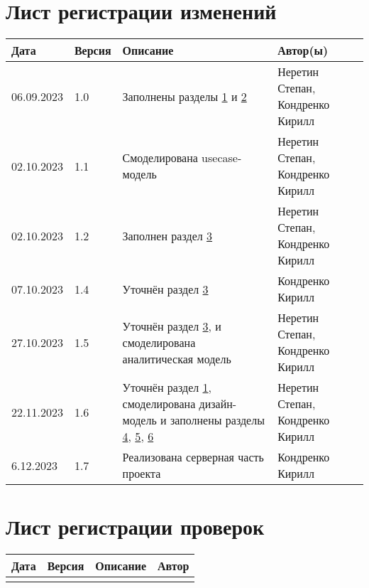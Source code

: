 \chapter*{Лист регистрации изменений}
	\begin{tabularx}{\textwidth}{
			| >{\centering\arraybackslash\hsize=2.5cm}X
			| >{\centering\arraybackslash\hsize=1.5cm}X
			| >{\centering\arraybackslash}X
			| >{\centering\arraybackslash\hsize=5cm}X
			|}
		\hline
		\textbf{Дата} & \textbf{Версия} & \textbf{Описание} & \textbf{Автор(ы)} \\\hline
		
		06.09.2023 & 1.0 & Заполнены разделы \hyperref[chapter1]{1} и \hyperref[chapter2]{2} & Неретин Степан, Кондренко Кирилл \\\hline
				
		02.10.2023 & 1.1 & Смоделирована usecase-модель & Неретин Степан, Кондренко Кирилл \\\hline
		
		02.10.2023 & 1.2 & Заполнен раздел \hyperref[chapter3]{3} & Неретин Степан, Кондренко Кирилл \\\hline
		
		07.10.2023 & 1.4 & Уточнён раздел \hyperref[chapter3]{3} & Кондренко Кирилл \\\hline

		27.10.2023 & 1.5 & Уточнён раздел \hyperref[chapter3]{3}, и смоделирована аналитическая модель & Неретин Степан, Кондренко Кирилл \\\hline
		
		22.11.2023 & 1.6 & Уточнён раздел \hyperref[chapter1]{1}, смоделирована дизайн-модель и заполнены разделы \hyperref[chapter4]{4}, \hyperref[chapter5]{5}, \hyperref[chapter6]{6} & Неретин Степан, Кондренко Кирилл \\\hline
		
		6.12.2023 & 1.7 & Реализована серверная часть проекта & Кондренко Кирилл \\\hline
	\end{tabularx}
\chapter*{Лист регистрации проверок}
	\begin{tabularx}{\textwidth}{
			| >{\centering\arraybackslash\hsize=2cm}X
			| >{\centering\arraybackslash\hsize=1.5cm}X
			| >{\centering\arraybackslash}X
			| >{\centering\arraybackslash\hsize=5cm}X
			|}
		\hline
		\textbf{Дата} & \textbf{Версия} & \textbf{Описание} & \textbf{Автор} \\\hline
		&&& \\\hline
	\end{tabularx}
